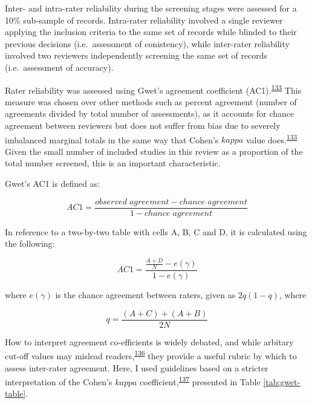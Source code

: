 \documentclass[a4paper, twoside]{templates/ociamthesis}
\begin{document}
Inter- and intra-rater reliability during the screening stages were assessed for a 10\% sub-sample of records. Intra-rater reliability involved a single reviewer applying the inclusion criteria to the same set of records while blinded to their previous decisions (i.e.~assessment of conistency), while inter-rater reliability involved two reviewers independently screening the same set of records (i.e.~assessment of accuracy).

Rater reliability was assessed using Gwet's agreement coefficient (AC1).\textsuperscript{\protect\hyperlink{ref-gwet2008}{133}} This measure was chosen over other methods such as percent agreement (number of agreements divided by total number of assessments), as it accounts for chance agreement between reviewers but does not suffer from bias due to severely imbalanced marginal totals in the same way that Cohen's \(kappa\) value does.\textsuperscript{\protect\hyperlink{ref-gwet2008}{133}} Given the small number of included studies in this review as a proportion of the total number screened, this is an important characteristic.

Gwet's AC1 is defined as:

\[AC1 = \frac{observed\;agreement-chance\;agreement}{1-chance\;agreement}\]

In reference to a two-by-two table with cells A, B, C and D, it is calculated using the following:

\begin{equation}
  AC1 = \frac{\frac{A+D}{N}-e(\gamma)}{1-e(\gamma)}
  \label{eq:AC1-main}
\end{equation}

where \(e(\gamma)\) is the chance agreement between raters, given as \(2q(1-q)\), where

\begin{equation}
  q = \frac{(A+C)+(A+B)}{2N}
  \label{eq:AC1-supp}
\end{equation}

How to interpret agreement co-efficients is widely debated, and while arbitary cut-off values may mislead readers,\textsuperscript{\protect\hyperlink{ref-brennan1992}{136}} they provide a useful rubric by which to assess inter-rater agreement. Here, I used guidelines based on a stricter interpretation of the Cohen's \(kappa\) coefficient,\textsuperscript{\protect\hyperlink{ref-mchugh2012}{137}} presented in Table \ref{tab:gwet-table}.

~
\end{document}
